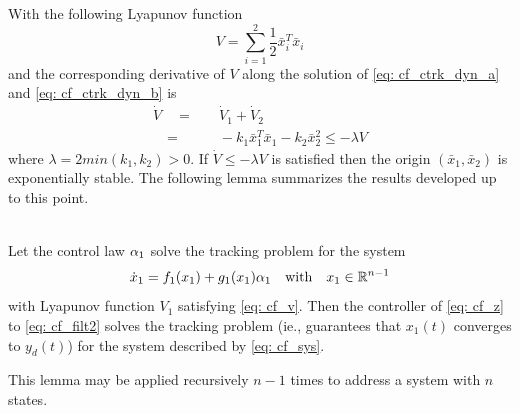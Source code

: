 \documentclass[12pt]{ucthesis}
\begin{document}
With the following Lyapunov function
	\begin{equation} \label{eq: cf_v}%
		V = \sum^2_{i=1} \frac{1}{2}\bar{x}^T_i \bar{x}_i
	\end{equation}
and the corresponding derivative of $V$ along the solution of \autoref{eq: cf_ctrk_dyn_a} and \ref{eq: cf_ctrk_dyn_b} is 
	\begin{equation} \label{eq: cf_vdot2}%
		\begin{aligned}
			\dot{V} \quad=&\quad \dot{V}_1 + \dot{V}_2 \\
					\quad=&\quad -k_1 \bar{x}^T_1 \bar{x}_1 - k_2 \bar{x}^2_2 \leq -\lambda V
		\end{aligned}
	\end{equation}
where $\lambda = 2min(k_1,k_2) > 0$. If $\dot{V} \leq -\lambda V$ is satisfied then the origin $(\bar{x}_1,\bar{x}_2)$ is exponentially stable. The following lemma summarizes the results developed up to this point.

\begin{lem} \label{lem: cfbs} \alignright \citet[Lem. 5.3.2]{Farrell2006}\\
Let the control law $\alpha_1$ solve the tracking problem for the system
$$ \dot{x}_1 = f_1(x_1) + g_1(x_1)\alpha_1 \quad \text{with} \quad x_1 \in \mathbb{R}^{n-1}$$
with Lyapunov function $V_1$ satisfying \autoref{eq: cf_v}. Then the controller of \autoref{eq: cf_z} to \ref{eq: cf_filt2} solves the tracking problem (ie., guarantees that $x_1(t)$ converges to $y_d(t)$) for the system described by \autoref{eq: cf_sys}.
\end{lem}

This lemma may be applied recursively $n-1$ times to address a system with $n$ states.
\end{document}
